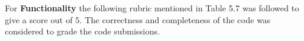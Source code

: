 



\newpage

For \textbf{Functionality} the following rubric mentioned in Table 5.7 was followed to give a score out of 5. The correctness and completeness of the code was considered to grade the code submissions.

